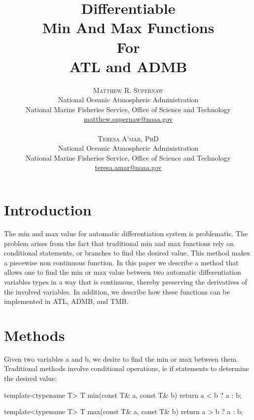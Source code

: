 \documentclass[oneside]{article}
\title{\vspace{-15mm}\fontsize{24pt}{10pt}\selectfont\textbf{Differentiable  \protect\\ Min And Max Functions \protect\\
For \protect\\
ATL and  ADMB}} %
\author{
\large
\textsc{Matthew R. Supernaw}\\[2mm] %
\normalsize National Oceanic Atmospheric Administration \\ %
\normalsize National Marine Fisheries Service, Office of Science and Technology\\ %
\normalsize \href{mailto:matthew.supernaw@noaa.gov}{matthew.supernaw@noaa.gov} \\ %
\\
\textsc{Teresa A'mar, PhD}\\[2mm] %
\normalsize National Oceanic Atmospheric Administration \\ %
\normalsize National Marine Fisheries Service, Office of Science and Technology\\ %
\normalsize \href{mailto:teresa.amar@noaa.gov}{teresa.amar@noaa.gov} \\%
\vspace{-5mm}
}
\date{}
\begin{document}
\maketitle %

\thispagestyle{fancy} %


%
%
%


\newpage
\tableofcontents
\newpage

\section{Introduction}
The min and max value for automatic differentiation system is problematic. The problem arises from the fact that traditional min and max functions rely on conditional statements, or branches to find the desired value. This method makes a piecewise non continuous function.  In this paper we describe a method that allows one to find the min or max value between two automatic differentiation variables types in a way that is continuous, thereby preserving the derivatives of the involved variables. In addition, we describe how these functions can be implemented in ATL, ADMB, and TMB.


\section{Methods}
Given two variables a and b, we desire to find the min or max between them. Traditional methods involve conditional operations, ie if statements to determine the desired value:

\begin{cppsource}
template<typename T>
T min(const T& a, const T& b){
   return a < b ? a : b;
} 

template<typename T>
T max(const T& a, const T& b){
   return a > b ? a : b;
} 

\end{cppsource}
\end{document}

